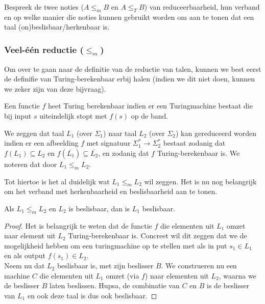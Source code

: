 \begin{question}
	Bespreek de twee noties ($A \leq_m B$ en $A \leq_T B$) van reduceerbaarheid, hun verband en op welke manier die noties kunnen gebruikt worden om aan te tonen dat een taal (on)beslisbaar/herkenbaar is.
\end{question}

\subsubsection*{Veel-\'e\'en reductie ($\leq_m$)}

Om over te gaan naar de definitie van de reductie van talen, kunnen we best eerst de definifie van Turing-berekenbaar erbij halen (indien we dit niet doen, kunnen we zeker zijn van deze bijvraag).

\begin{theorem}
	Een functie $f$ heet Turing berekenbaar indien er een Turingmachine bestaat die bij input $s$ uiteindelijk stopt met $f(s)$ op de band.
\end{theorem}

\begin{theorem}
	We zeggen dat taal $L_1$ (over $\Sigma_1$) naar taal $L_2$ (over $\Sigma_2$) kan gereduceerd worden indien er een afbeelding $f$ met signatuur $\Sigma^*_1\longrightarrow \Sigma^*_2$ bestaat zodanig dat $f(L_1) \subseteq L_2$ en $f(\overline{L_1}) \subseteq \overline{L_2}$, en zodanig dat $f$ Turing-berekenbaar is. We noteren dat door $L_1 \leq_m L_2$.
\end{theorem}

Tot hiertoe is het al duidelijk wat $L_1 \leq_m L_2$ wil zeggen. Het is nu nog belangrijk om het verband met herkenbaarheid en beslisbaarheid aan te tonen.

\begin{theorem}
	Als $L_1 \leq_m L_2$ en $L_2$ is beslisbaar, dan is $L_1$ beslisbaar.
\end{theorem}

\begin{proof}
	Het is belangrijk te weten dat de functie $f$ die elementen uit $L_1$ omzet naar element uit $L_2$ Turing-berekenbaar is. Concreet wil dit zeggen dat we de mogelijkheid hebben om een turingmachine op te stellen met als in put $s_1 \in L_1$ en als output $f(s_1) \in L_2$.\\
	Neem nu dat $L_2$ beslisbaar is, met zijn beslisser $B$. We construeren  nu een machine $C$ die elementen uit $L_1$ omzet (via $f$) naar elementen uit $L_2$, waarna we de beslisser $B$ laten beslissen. Hupsa, de combinatie van $C$ en $B$ is de beslisser van $L_1$ en ook deze taal is dus ook beslisbaar.
\end{proof}

